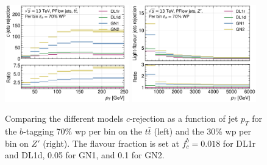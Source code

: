 \begin{figure}[h!]
  \centering
  \includegraphics[width=0.48\textwidth]{Images/FTAG/GN/GN2/pt_plots/pt_ttbar_flat_c_rej.png}
  \includegraphics[width=0.48\textwidth]{Images/FTAG/GN/GN2/pt_plots/pt_zp_flat_c_rej.png}
  \caption{Comparing the different models $c$-rejection as a function of jet $p_T$ for the $b$-tagging 70\% \gls{wp} per bin on the $t\bar{t}$ (left) and the 30\% \gls{wp} per bin on $Z'$ (right). The flavour fraction is set at $f^b_c = 0.018$ for DL1r and DL1d, 0.05 for GN1, and 0.1 for GN2.}
  \label{fig:GNxptb_crejflat}
\end{figure} 

